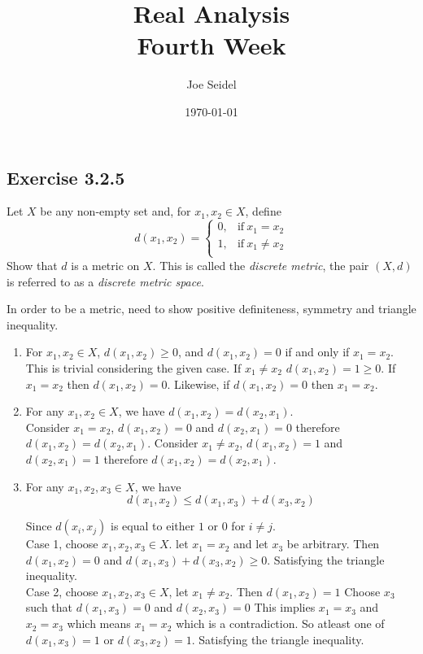 \documentclass{tufte-book}
\title{Real Analysis\\Fourth Week }
\author{Joe Seidel}
\date{\today}
\theoremstyle{mytheoremstyle}
\theoremstyle{mylemstyle}
\theoremstyle{mydefstyle}
\begin{document}
\maketitle
{}
\newpage
{}

\subsection{Exercise 3.2.5}
Let $X$ be any non-empty set and, for $x_1, x_2 \in X$, define
\[d(x_1, x_2) = 
\begin{cases}
      0, & \text{if}\ x_1=x_2 \\
      1, & \text{if}\ x_1\neq x_2\\
\end{cases}
\]
Show that $d$ is a metric on $X$. This is called the \textit{discrete metric}, the pair $(X,d)$ is referred to as a \textit{discrete metric space}.

In order to be a metric, need to show positive definiteness, symmetry and triangle inequality.

\begin{enumerate}
\item For $x_1, x_2 \in X$, $d(x_1, x_2) \geq 0$, and $d(x_1, x_2) = 0$ if and only if $x_1=x_2$.\\
This is trivial considering the given case.  If $x_1 \neq x_2$ $d(x_1,x_2) = 1 \geq 0$. If $x_1 = x_2$ then $d(x_1, x_2) = 0$.  Likewise, if $d(x_1, x_2) = 0$ then $x_1 = x_2$.

\item For any $x_1, x_2 \in X$, we have $d(x_1, x_2) = d(x_2, x_1)$.\\
Consider $x_1 = x_2$, $d(x_1, x_2) = 0$ and $d(x_2, x_1) = 0$ therefore $d(x_1, x_2) = d(x_2, x_1)$.  Consider $x_1 \neq x_2$, $d(x_1, x_2) = 1$ and $d(x_2, x_1) = 1$ therefore $d(x_1, x_2) = d(x_2, x_1)$.

\item For any $x_1, x_2, x_3 \in X$, we have 
\[d(x_1,x_2) \leq d(x_1, x_3) + d(x_3, x_2) \]

Since $d(x_i, x_j)$ is equal to either $1$ or $0$ for $i \neq j$.\\
Case 1, choose $x_1, x_2, x_3 \in X$. let $x_1 = x_2$ and let $x_3$ be arbitrary. Then $d(x_1,x_2) = 0$  and $d(x_1,x_3) + d(x_3,x_2) \geq 0$. Satisfying the triangle inequality.\\
Case 2, choose $x_1, x_2, x_3 \in X$, let $x_1 \neq x_2$.  Then $d(x_1,x_2) = 1$  Choose $x_3$ such that $d(x_1, x_3) = 0$ and $d(x_2,x_3) = 0$  This implies $x_1=x_3$ and $x_2=x_3$ which means $x_1=x_2$ which is a contradiction.  So atleast one of $d(x_1, x_3) = 1$ or $d(x_3, x_2) = 1$.  Satisfying the triangle inequality.
\end{enumerate}
\end{document}

